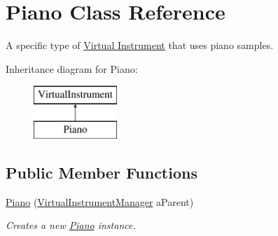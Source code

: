 \hypertarget{class_piano}{}\section{Piano Class Reference}
\label{class_piano}


A specific type of \hyperlink{group___v_i}{Virtual Instrument} that uses piano samples.  


Inheritance diagram for Piano\+:\begin{figure}[H]
\begin{center}
\leavevmode
\includegraphics[height=2.000000cm]{class_piano}
\end{center}
\end{figure}
\subsection*{Public Member Functions}
\begin{DoxyCompactItemize}
\item 
\hyperlink{group___piano_construct_ga5128747ca1a1fbdc94a78362d3b87eed}{Piano} (\hyperlink{class_virtual_instrument_manager}{Virtual\+Instrument\+Manager} a\+Parent)
\begin{DoxyCompactList}\small\item\em Creates a new \hyperlink{class_piano}{Piano} instance. \end{DoxyCompactList}\end{DoxyCompactItemize}
